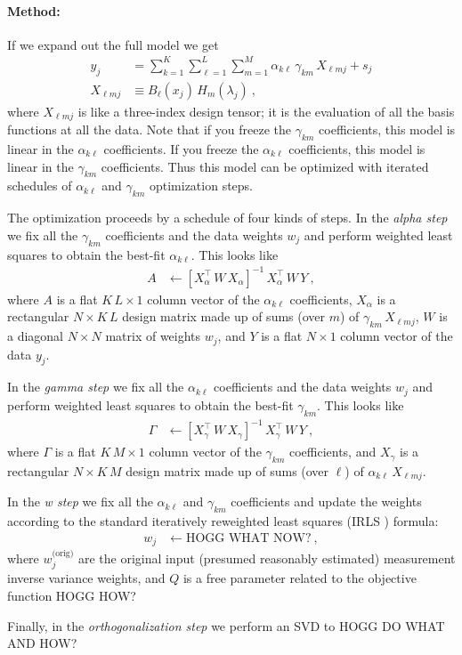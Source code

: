 \documentclass{article}
\begin{document}
\paragraph{Method:}
If we expand out the full model we get
\begin{align}
    y_j &= \sum_{k=1}^K \sum_{\ell=1}^L \sum_{m=1}^M \alpha_{k\ell}\,\gamma_{km}\,X_{\ell mj} + s_j \\
    X_{\ell mj} &\equiv B_\ell(x_j)\,H_m(\lambda_j) ~,
\end{align}
where $X_{\ell mj}$ is like a three-index design tensor; it is the evaluation of all the basis functions at all the data.
Note that if you freeze the $\gamma_{km}$ coefficients, this model is linear in the $\alpha_{k\ell}$ coefficients.
If you freeze the $\alpha_{k\ell}$ coefficients, this model is linear in the $\gamma_{km}$ coefficients.
Thus this model can be optimized with iterated schedules of $\alpha_{k\ell}$ and $\gamma_{km}$ optimization steps.

The optimization proceeds by a schedule of four kinds of steps.
In the \emph{alpha step} we fix all the $\gamma_{km}$ coefficients and the data weights $w_j$ and perform weighted least squares to obtain the best-fit $\alpha_{k\ell}$. This looks like
\begin{align}
    A &\leftarrow [X_\alpha^\top\,W\,X_\alpha]^{-1}\,X_\alpha^\top\,W\,Y ~,
\end{align}
where $A$ is a flat $K\,L\times 1$ column vector of the $\alpha_{k\ell}$ coefficients,
$X_\alpha$ is a rectangular $N\times K\,L$ design matrix made up of sums (over $m$) of $\gamma_{km}\,X_{\ell mj}$,
$W$ is a diagonal $N\times N$ matrix of weights $w_j$,
and $Y$ is a flat $N\times 1$ column vector of the data $y_j$.

In the \emph{gamma step} we fix all the $\alpha_{k\ell}$ coefficients and the data weights $w_j$ and perform weighted least squares to obtain the best-fit $\gamma_{km}$. This looks like
\begin{align}
    \Gamma &\leftarrow [X_\gamma^\top\,W\,X_\gamma]^{-1}\,X_\gamma^\top\,W\,Y ~,
\end{align}
where $\Gamma$ is a flat $K\,M\times 1$ column vector of the $\gamma_{km}$ coefficients,
and $X_\gamma$ is a rectangular $N\times K\,M$ design matrix made up of sums (over $\ell$) of $\alpha_{k\ell}\,X_{\ell mj}$.

In the \emph{w step} we fix all the $\alpha_{k\ell}$ and $\gamma_{km}$ coefficients and update the weights according to the standard iteratively reweighted least squares (IRLS \cite{irls}) formula:
\begin{align}
    w_j &\leftarrow \text{HOGG WHAT NOW?} ~,
\end{align}
where $w_j^\text{(orig)}$ are the original input (presumed reasonably estimated) measurement inverse variance weights,
and $Q$ is a free parameter related to the objective function HOGG HOW?

Finally, in the \emph{orthogonalization step} we perform an SVD to HOGG DO WHAT AND HOW?



\end{document}
